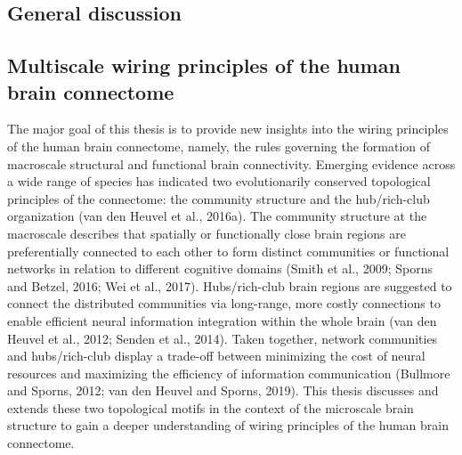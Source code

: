 \begin{refsection}
\section*{General discussion}
\subsection*{Multiscale wiring principles of the human brain connectome}
The major goal of this thesis is to provide new insights into the wiring principles of the human brain connectome, namely, the rules governing the formation of macroscale structural and functional brain connectivity. Emerging evidence across a wide range of species has indicated two evolutionarily conserved topological principles of the connectome: the community structure and the hub/rich-club organization (van den Heuvel et al., 2016a). The community structure at the macroscale describes that spatially or functionally close brain regions are preferentially connected to each other to form distinct communities or functional networks in relation to different cognitive domains (Smith et al., 2009; Sporns and Betzel, 2016; Wei et al., 2017). Hubs/rich-club brain regions are suggested to connect the distributed communities via long-range, more costly connections to enable efficient neural information integration within the whole brain (van den Heuvel et al., 2012; Senden et al., 2014). Taken together, network communities and hubs/rich-club display a trade-off between minimizing the cost of neural resources and maximizing the efficiency of information communication (Bullmore and Sporns, 2012; van den Heuvel and Sporns, 2019). This thesis discusses and extends these two topological motifs in the context of the microscale brain structure to gain a deeper understanding of wiring principles of the human brain connectome.


\end{refsection}
